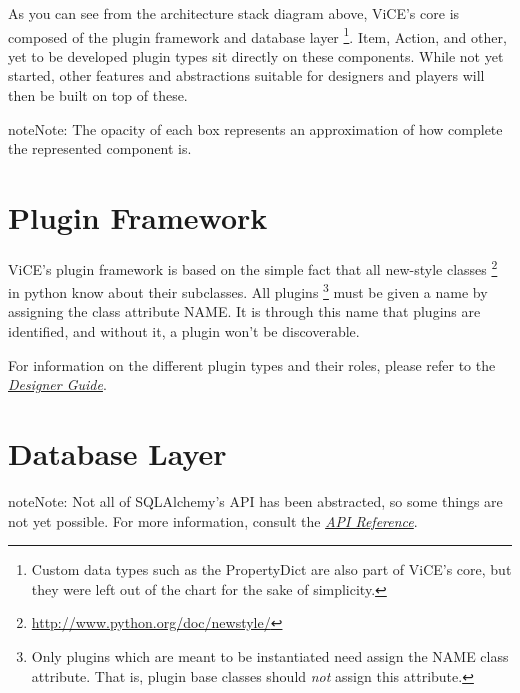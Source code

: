 \documentclass[letterpaper,10pt,english]{sphinxmanual}
\begin{document}
As you can see from the architecture stack diagram above, ViCE's core is
composed of the plugin framework and database layer \footnote{
Custom data types such as the PropertyDict are also part of ViCE's
core, but they were left out of the chart for the sake of simplicity.
}. Item, Action, and other,
yet to be developed plugin types sit directly on these components. While not
yet started, other features and abstractions suitable for designers and
players will then be built on top of these.

\begin{notice}{note}{Note:}
The opacity of each box represents an approximation of how complete the
represented component is.
\end{notice}


\section{Plugin Framework}
\label{developer_guide/architecture:plugin-framework}
ViCE's plugin framework is based on the simple fact that all new-style
classes \footnote{
\href{http://www.python.org/doc/newstyle/}{http://www.python.org/doc/newstyle/}
} in python know about their subclasses. All plugins \footnote{
Only plugins which are meant to be instantiated need assign the NAME
class attribute. That is, plugin base classes should \emph{not} assign
this attribute.
} must
be given a name by assigning the class attribute NAME. It is through this
name that plugins are identified, and without it, a plugin won't be
discoverable.

For information on the different plugin types and their roles, please
refer to the {\hyperref[designer_guide/designer_index::doc]{\emph{Designer Guide}}}.


\section{Database Layer}
\label{developer_guide/architecture:database-layer}
\begin{notice}{note}{Note:}
Not all of SQLAlchemy's API has been abstracted, so some things are
not yet possible. For more information, consult the {\hyperref[api_reference::doc]{\emph{API Reference}}}.
\end{notice}
\end{document}
